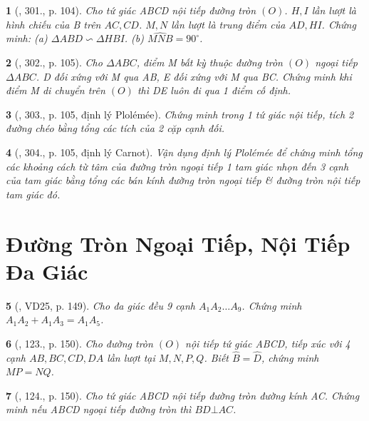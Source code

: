 \documentclass{article}
\newtheorem{baitoan}{}
\begin{document}
\begin{baitoan}[\cite{Binh_Toan_9_tap_2}, 301., p. 104]
	Cho tứ giác ABCD nội tiếp đường tròn $(O)$. $H,I$ lần lượt là hình chiếu của B trên $AC,CD$. $M,N$ lần lượt là trung điểm của $AD,HI$. Chứng minh: (a) $\Delta ABD\backsim\Delta HBI$. (b) $\widehat{MNB} = 90^\circ$.
\end{baitoan}

\begin{baitoan}[\cite{Binh_Toan_9_tap_2}, 302., p. 105]
	Cho $\Delta ABC$, điểm M bất kỳ thuộc đường tròn $(O)$ ngoại tiếp $\Delta ABC$. D đối xứng với M qua AB, E đối xứng với M qua BC. Chứng minh khi điểm M di chuyển trên $(O)$ thì DE luôn đi qua 1 điểm cố định.
\end{baitoan}

\begin{baitoan}[\cite{Binh_Toan_9_tap_2}, 303., p. 105, định lý Plol\'em\'ee]
	Chứng minh trong 1 tứ giác nội tiếp, tích 2 đường chéo bằng tổng các tích của 2 cặp cạnh đối.
\end{baitoan}

\begin{baitoan}[\cite{Binh_Toan_9_tap_2}, 304., p. 105, định lý Carnot]
	Vận dụng định lý Plol\'em\'ee để chứng minh tổng các khoảng cách từ tâm của đường tròn ngoại tiếp 1 tam giác nhọn đến 3 cạnh của tam giác bằng tổng các bán kính đường tròn ngoại tiếp \& đường tròn nội tiếp tam giác đó.
\end{baitoan}


\section{Đường Tròn Ngoại Tiếp, Nội Tiếp Đa Giác}

\begin{baitoan}[\cite{Tuyen_Toan_9_old}, VD25, p. 149]
	Cho đa giác đều 9 cạnh $A_1A_2\ldots A_9$. Chứng minh $A_1A_2 + A_1A_3 = A_1A_5$.
\end{baitoan}

\begin{baitoan}[\cite{Tuyen_Toan_9_old}, 123., p. 150]
	Cho đường tròn $(O)$ nội tiếp tứ giác ABCD, tiếp xúc với 4 cạnh $AB,BC,CD,DA$ lần lượt tại $M,N,P,Q$. Biết $\widehat{B} = \widehat{D}$, chứng minh $MP = NQ$.
\end{baitoan}

\begin{baitoan}[\cite{Tuyen_Toan_9_old}, 124., p. 150]
	Cho tứ giác ABCD nội tiếp đường tròn đường kính AC. Chứng minh nếu ABCD ngoại tiếp đường tròn thì $BD\bot AC$.
\end{baitoan}
\end{document}
